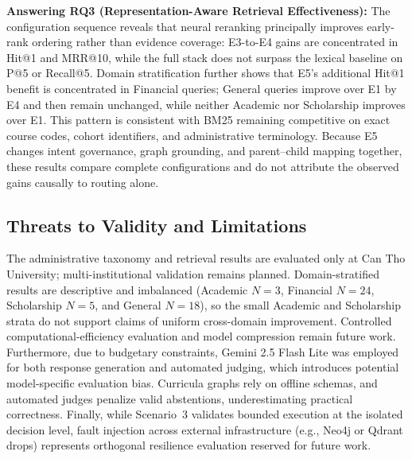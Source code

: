 \textbf{Answering RQ3 (Representation-Aware Retrieval Effectiveness):} The configuration sequence reveals that neural reranking principally improves early-rank ordering rather than evidence coverage: E3-to-E4 gains are concentrated in Hit@1 and MRR@10, while the full stack does not surpass the lexical baseline on P@5 or Recall@5. Domain stratification further shows that E5's additional Hit@1 benefit is concentrated in Financial queries; General queries improve over E1 by E4 and then remain unchanged, while neither Academic nor Scholarship improves over E1. This pattern is consistent with BM25 remaining competitive on exact course codes, cohort identifiers, and administrative terminology. Because E5 changes intent governance, graph grounding, and parent--child mapping together, these results compare complete configurations and do not attribute the observed gains causally to routing alone.

\subsection{Threats to Validity and Limitations}
\label{sec:limitations}

The administrative taxonomy and retrieval results are evaluated only at Can Tho University; multi-institutional validation remains planned. Domain-stratified results are descriptive and imbalanced (Academic $N=3$, Financial $N=24$, Scholarship $N=5$, and General $N=18$), so the small Academic and Scholarship strata do not support claims of uniform cross-domain improvement. Controlled computational-efficiency evaluation and model compression remain future work. Furthermore, due to budgetary constraints, Gemini 2.5 Flash Lite was employed for both response generation and automated judging, which introduces potential model-specific evaluation bias. Curricula graphs rely on offline schemas, and automated judges penalize valid abstentions, underestimating practical correctness. Finally, while Scenario~3 validates bounded execution at the isolated decision level, fault injection across external infrastructure (e.g., Neo4j or Qdrant drops) represents orthogonal resilience evaluation reserved for future work.
